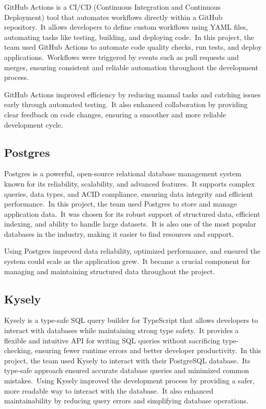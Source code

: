 GitHub Actions is a CI/CD (Continuous Integration and Continuous Deployment) tool that automates workflows directly within a GitHub repository.\ It allows developers to define custom workflows using YAML files, automating tasks like testing, building, and deploying code.\ In this project, the team used GitHub Actions to automate code quality checks, run tests, and deploy applications.\ Workflows were triggered by events such as pull requests and merges, ensuring consistent and reliable automation throughout the development process.\cite[GitHub Actions]{githubActions}

GitHub Actions improved efficiency by reducing manual tasks and catching issues early through automated testing.\ It also enhanced collaboration by providing clear feedback on code changes, ensuring a smoother and more reliable development cycle.

\subsection{Postgres}\label{subsec:postgres}

Postgres is a powerful, open-source relational database management system known for its reliability, scalability, and advanced features.\ It supports complex queries, data types, and ACID compliance, ensuring data integrity and efficient performance.\ In this project, the team used Postgres to store and manage application data.\ It was chosen for its robust support of structured data, efficient indexing, and ability to handle large datasets.\ It is also one of the most popular databases in the industry, making it easier to find resources and support.\cite[Postgres]{postgres}

Using Postgres improved data reliability, optimized performance, and ensured the system could scale as the application grew.\ It became a crucial component for managing and maintaining structured data throughout the project.

\subsection{Kysely}\label{subsec:kysely}

Kysely is a type-safe SQL query builder for TypeScript that allows developers to interact with databases while maintaining strong type safety.\ It provides a flexible and intuitive API for writing SQL queries without sacrificing type-checking, ensuring fewer runtime errors and better developer productivity.\ In this project, the team used Kysely to interact with their PostgreSQL database.\ Its type-safe approach ensured accurate database queries and minimized common mistakes.\ Using Kysely improved the development process by providing a safer, more readable way to interact with the database.\ It also enhanced maintainability by reducing query errors and simplifying database operations.\cite[Kysely]{kysely}

